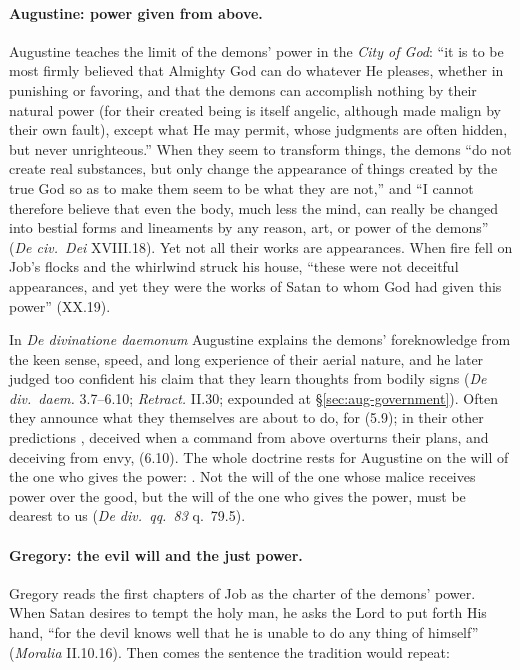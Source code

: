 \paragraph{Augustine: power given from above.} Augustine teaches the
limit of the demons' power in the \emph{City of God}: ``it is to be most
firmly believed that Almighty God can do whatever He pleases, whether in
punishing or favoring, and that the demons can accomplish nothing by their
natural power (for their created being is itself angelic, although made
malign by their own fault), except what He may permit, whose judgments are
often hidden, but never unrighteous.'' When they seem to transform things,
the demons ``do not create real substances, but only change the appearance
of things created by the true God so as to make them seem to be what they
are not,'' and ``I cannot therefore believe that even the body, much less
the mind, can really be changed into bestial forms and lineaments by any
reason, art, or power of the demons'' (\emph{De civ.\ Dei} XVIII.18). Yet
not all their works are appearances. When fire fell on Job's flocks and the
whirlwind struck his house, ``these were not deceitful appearances, and yet
they were the works of Satan to whom God had given this power'' (XX.19).

In \emph{De divinatione daemonum} Augustine explains the demons'
foreknowledge from the keen sense, speed, and long experience of their
aerial nature, and he later judged too confident his claim that they learn
thoughts from bodily signs (\emph{De div.\ daem.} 3.7--6.10;
\emph{Retract.} II.30; expounded at \S\ref{sec:aug-government}). Often they
announce what they themselves are about to do, for  (5.9); in their other predictions , deceived when a command from above overturns their
plans, and deceiving from envy,  (6.10).
The whole doctrine
rests for Augustine on the will of the one who gives the power: . Not the will of the
one whose malice receives power over the good, but the will of the one who
gives the power, must be dearest to us (\emph{De div.\ qq.\ 83} q.~79.5).

\paragraph{Gregory: the evil will and the just power.} Gregory reads the
first chapters of Job as the charter of the demons' power. When Satan
desires to tempt the holy man, he asks the Lord to put forth His hand,
``for the devil knows well that he is unable to do any thing of himself''
(\emph{Moralia} II.10.16). Then comes the sentence the tradition would
repeat:

